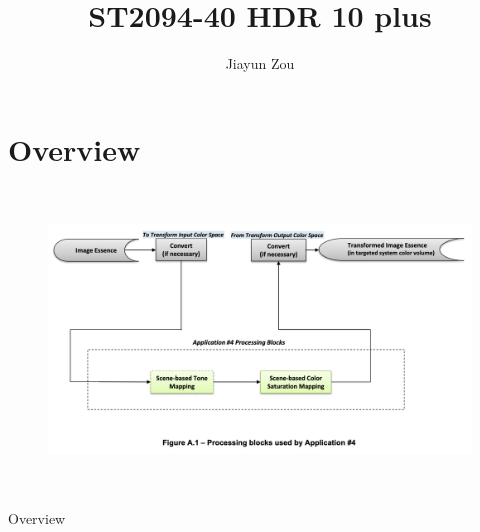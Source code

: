 \documentclass{article}
\title{ST2094-40 HDR 10 plus}
\author{Jiayun Zou}
\date{}
\begin{document}
\maketitle
\thispagestyle{empty}
\newpage

\tableofcontents
\thispagestyle{empty}
\newpage

\setlength{\parindent}{2em}

\section{Overview}
\begin{figure}[h]
    \centering
    \includegraphics[width=12cm,height=8cm]{Figure1.png}
\end{figure}
Overview \cite{DMfCVTA4}
\end{document}
